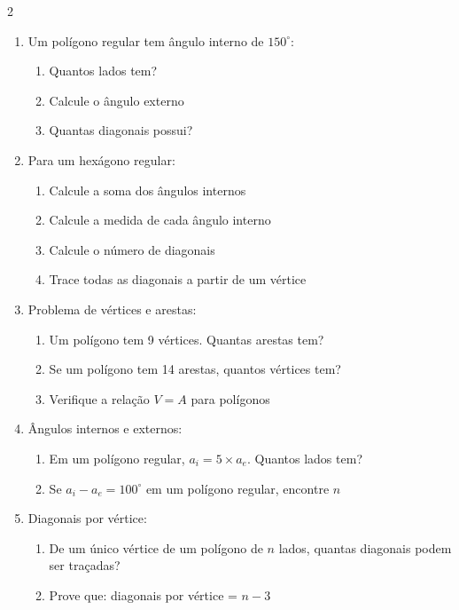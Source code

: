 \documentclass[11pt]{article}
\begin{document}
\begin{multicols}{2}
\begin{enumerate}[leftmargin=*]
\item Um polígono regular tem ângulo interno de $150^\circ$:
\begin{enumerate}[label=\alph*)]
\item Quantos lados tem?
\item Calcule o ângulo externo
\item Quantas diagonais possui?
\end{enumerate}

\item Para um hexágono regular:
\begin{center}
\end{center}
\begin{enumerate}[label=\alph*)]
\item Calcule a soma dos ângulos internos
\item Calcule a medida de cada ângulo interno
\item Calcule o número de diagonais
\item Trace todas as diagonais a partir de um vértice
\end{enumerate}

\item Problema de vértices e arestas:
\begin{enumerate}[label=\alph*)]
\item Um polígono tem 9 vértices. Quantas arestas tem?
\item Se um polígono tem 14 arestas, quantos vértices tem?
\item Verifique a relação $V = A$ para polígonos
\end{enumerate}

\item Ângulos internos e externos:
\begin{enumerate}[label=\alph*)]
\item Em um polígono regular, $a_i = 5 \times a_e$. Quantos lados tem?
\item Se $a_i - a_e = 100^\circ$ em um polígono regular, encontre $n$
\end{enumerate}

\item Diagonais por vértice:
\begin{enumerate}[label=\alph*)]
\item De um único vértice de um polígono de $n$ lados, quantas diagonais podem ser traçadas?
\item Prove que: diagonais por vértice = $n - 3$
\end{enumerate}


\end{enumerate}
\end{multicols}
\end{document}
